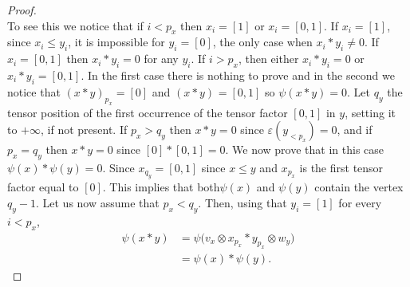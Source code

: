 \begin{proof}
\begin{equation*}
	\end{equation*}
	To see this we notice that if $i < p_x$ then $x_i = [1]$ or $x_i = [0,1]$.
	If $x_i = [1]$, since $x_i \leq y_i$, it is impossible for $y_i = [0]$, the only case when $x_i \ast y_i \neq 0$.
	If $x_i = [0,1]$ then $x_i \ast y_i = 0$ for any $y_i$.
	If $i > p_x$, then either $x_i \ast y_i = 0$ or $x_i \ast y_i = [0,1]$.
	In the first case there is nothing to prove and in the second we notice that $(x \ast y)_{p_x} = [0]$ and $(x \ast y)_{} = [0,1]$ so $\psi(x \ast y) = 0$.
	Let $q_y$ the tensor position of the first occurrence of the tensor factor $[0,1]$ in $y$, setting it to $+\infty$, if not present.
	If $p_x > q_y$ then $x \ast y = 0$ since $\varepsilon(y_{<p_x}) = 0$, and if $p_x = q_y$ then $x \ast y = 0$ since $[0] \ast [0,1] = 0$.
	We now prove that in this case $\psi(x) \ast \psi(y) = 0$.
	Since $x_{q_y} = [0,1]$ since $x \leq y$ and $x_{p_x}$ is the first tensor factor equal to $[0]$.
	This implies that both$\psi(x)$ and $\psi(y)$ contain the vertex $q_{y} - 1$.
	Let us now assume that $p_x < q_y$.
	Then, using that $y_i = [1]$ for every $i < p_x$,
	\begin{align*}
	\psi(x \ast y) & =
	\psi \big( v_x \otimes x_{p_x} \ast y_{p_x} \otimes w_y \big) \\ & =
	\psi(x) \ast \psi(y).
	\end{align*}
\end{proof}










